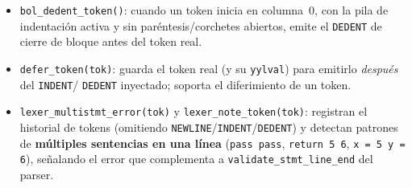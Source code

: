 \begin{itemize}
  \item \texttt{bol\_dedent\_token()}: cuando un token inicia en columna~0,
    con la pila de indentación activa y sin paréntesis/corchetes abiertos,
    emite el \texttt{DEDENT} de cierre de bloque antes del token real.
  \item \texttt{defer\_token(tok)}: guarda el token real (y su
    \texttt{yylval}) para emitirlo \emph{después} del \texttt{INDENT}/%
    \texttt{DEDENT} inyectado; soporta el diferimiento de un token.
  \item \texttt{lexer\_multistmt\_error(tok)} y
    \texttt{lexer\_note\_token(tok)}: registran el historial de tokens
    (omitiendo \texttt{NEWLINE}/\texttt{INDENT}/\texttt{DEDENT}) y detectan
    patrones de \textbf{múltiples sentencias en una línea}
    (\texttt{pass pass}, \texttt{return 5 6}, \texttt{x = 5 y = 6}),
    señalando el error que complementa a \texttt{validate\_stmt\_line\_end}
    del parser.
\end{itemize}



